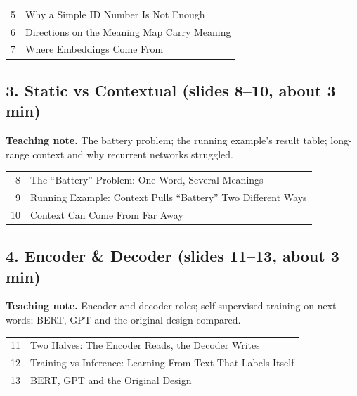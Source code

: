 \documentclass[11pt]{article}
\begin{document}
\begin{center}\small\renewcommand{\arraystretch}{1.1}\begin{tabularx}{\textwidth}{@{}r X@{}}5 & Why a Simple ID Number Is Not Enough\\
6 & Directions on the Meaning Map Carry Meaning\\
7 & Where Embeddings Come From\\\end{tabularx}\end{center}

\subsection{3. Static vs Contextual \normalfont\small\color{GreyN}(slides 8--10, about 3 min)}

\textbf{Teaching note.} The battery problem; the running example's result table; long-range context and why recurrent networks struggled.

\begin{center}\small\renewcommand{\arraystretch}{1.1}\begin{tabularx}{\textwidth}{@{}r X@{}}8 & The ``Battery'' Problem: One Word, Several Meanings\\
9 & Running Example: Context Pulls ``Battery'' Two Different Ways\\
10 & Context Can Come From Far Away\\\end{tabularx}\end{center}

\subsection{4. Encoder \& Decoder \normalfont\small\color{GreyN}(slides 11--13, about 3 min)}

\textbf{Teaching note.} Encoder and decoder roles; self-supervised training on next words; BERT, GPT and the original design compared.

\begin{center}\small\renewcommand{\arraystretch}{1.1}\begin{tabularx}{\textwidth}{@{}r X@{}}11 & Two Halves: The Encoder Reads, the Decoder Writes\\
12 & Training vs Inference: Learning From Text That Labels Itself\\
13 & BERT, GPT and the Original Design\\\end{tabularx}\end{center}
\end{document}

